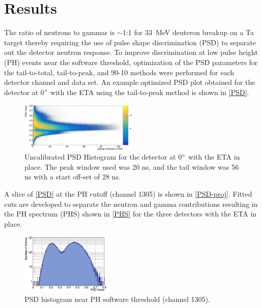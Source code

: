 \documentclass[twocolumn,10pt,final]{asme2ej}
\begin{document}
\vspace{-0.4 cm}
\section{Results} \label{sec:results}
The ratio of neutrons to gammas is $\sim$1:1 for 33~MeV deuteron breakup on a Ta target thereby requiring the use of pulse shape discrimination (PSD) to separate out the detector neutron response.
To improve discrimination at low pulse height (PH) events near the software threshold, optimization of the PSD parameters for the tail-to-total, tail-to-peak, and 90-10 methods were performed for each detector channel and data set.  
An example optimized PSD plot obtained for the detector at 0$\degree$ with the ETA using the tail-to-peak method is shown in \autoref{PSD}. 

\vspace{-0.5 cm}
\begin{figure} [htp!]
 \centering
 \includegraphics[trim = 0cm 0cm 0cm 0cm, clip, width=0.5\textwidth]{../Figs/psd.jpg}
   \caption{Uncalibrated PSD Histogram for the detector at 0$\degree$ with the ETA in place. The peak window used was 20 ns, and the tail window was 56 ns with a start off-set of 28 ns.}
  \label{PSD}
\vspace{-0.4 cm}
\end{figure}

A slice of \autoref{PSD} at the PH cutoff (channel 1305) is shown in \autoref{PSD-proj}.
Fitted cuts are developed to separate the neutron and gamma contributions resulting in the PH spectrum (PHS) shown in \autoref{PHS} for the three detectors with the ETA in place.

\vspace{-0.5 cm}
\begin{figure} [htp!]
 \centering
 \includegraphics[trim = 0cm 0cm 0cm 0cm, clip, width=0.41\textwidth]{../Figs/psd-proj.jpg}
   \caption{PSD histogram near PH software threshold (channel 1305).}
  \label{PSD-proj}
\vspace{-0.5 cm}
\end{figure}
\end{document}
